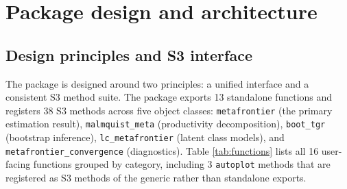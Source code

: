 \section{Package design and architecture}\label{sec:package-design}

\subsection{Design principles and S3 interface}\label{sec:design-principles}

The  package is designed around two principles: a unified
interface and a consistent S3 method suite. The package exports 13 standalone
functions and registers 38 S3 methods across five object classes:
\texttt{metafrontier} (the primary estimation result), \texttt{malmquist\_meta} (productivity
decomposition), \texttt{boot\_tgr} (bootstrap inference), \texttt{lc\_metafrontier}
(latent class models), and \texttt{metafrontier\_convergence} (diagnostics).
Table \ref{tab:functions} lists all 16 user-facing
functions grouped by category, including 3 \texttt{autoplot} methods that are
registered as S3 methods of the  generic rather than
standalone exports.

